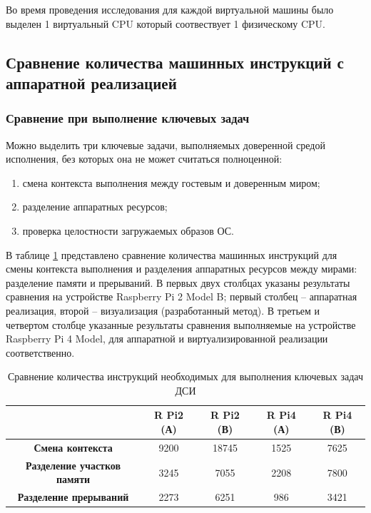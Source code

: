 Во время проведения исследования для каждой виртуальной машины было выделен 1 виртуальный CPU который соотвествует 1 физическому CPU.

\subsection{Сравнение количества машинных инструкций с аппаратной реализацией} 

\subsubsection{Сравнение при выполнение ключевых задач}

Можно выделить три ключевые задачи, выполняемых доверенной средой исполнения, без которых она не может считаться полноценной:

\begin{enumerate}[label*=\arabic*.]
	\item смена контекста выполнения между гостевым и доверенным миром;
	\item разделение аппаратных ресурсов;
	\item проверка целостности загружаемых образов ОС.
\end{enumerate}

В таблице \ref{table:perf-main-1} представлено сравнение количества машинных инструкций для смены контекста выполнения и разделения аппаратных ресурсов между мирами: разделение памяти и прерываний. В первых двух столбцах указаны результаты сравнения на устройстве Raspberry Pi 2 Model B; первый столбец -- аппаратная реализация, второй -- визуализация (разработанный метод). В третьем и четвертом столбце указанные результаты сравнения выполняемые на устройстве Raspberry Pi 4 Model, для аппаратной и виртуализированной реализации соответственно.

\begin{table}[!htb]
	\begin{center}
		\caption{Сравнение количества инструкций необходимых для выполнения ключевых задач ДСИ}
		\label{table:perf-main-1}
		\begin{tabular}{|c|c|c|c|c|}
			\hline
			& \bfseries R Pi2 (А) & \bfseries R Pi2 (В) & \bfseries R Pi4 (А) & \bfseries R Pi4 (В)\\
			\hline
			\bfseries Смена контекста & 9200 & 18745 & 1525 & 7625 \\ \hline
			\bfseries Разделение участков памяти & 3245 & 7055 & 2208 & 7800 \\ \hline
			\bfseries Разделение прерываний & 2273 & 6251 & 986 & 3421 \\ \hline	
		\end{tabular}
	\end{center}
\end{table}

